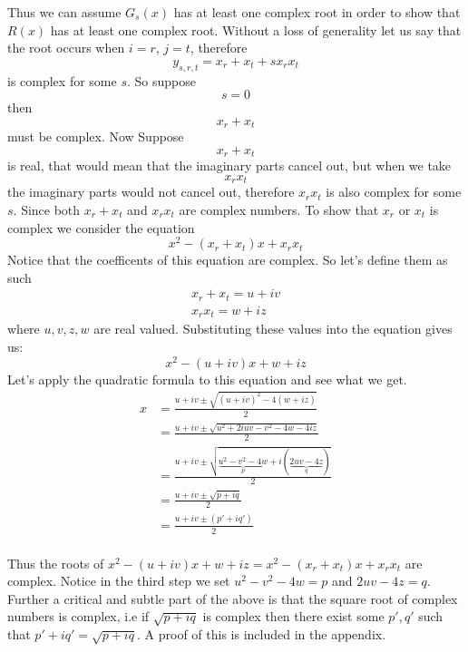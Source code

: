 \documentclass[12pt]{article}
\begin{document}
\begin{center}
\end{center}

  Thus we can assume $G_s(x)$ has at least one complex root in order to show that $R(x)$ has at least one complex root.  Without a loss of generality let us say that the root occurs when $i=r$, $j=t$, therefore 
$$y_{s,r,t} = x_r + x_t +s x_r x_t$$ 
is complex for some $s$.  So suppose 
$$s=0$$ 
then 
$$x_r + x_t$$ 
must be complex.  Now Suppose 
$$x_r + x_t$$ 
is real, that would mean that the imaginary parts cancel out, but when we take 
$$x_r x_t$$ 
the imaginary parts would not cancel out, therefore $x_r x_t$ is also complex for some $s$.  Since both $x_r+x_t$ and $x_r x_t$ are complex numbers.  To show that $x_r$ or $x_t$ is complex we consider the equation 
$$x^2 - (x_r +x_t)x + x_r x_t$$  Notice that the coefficents of this equation are complex.  So let's define them as such 
\begin{align*}
x_r + x_t = u + iv \\
x_r x_t = w +iz
\end{align*}
where $u,v,z,w$ are real valued.  Substituting these values into the equation gives us:
$$ x^2 -(u+iv)x + w +iz$$
Let's apply the quadratic formula to this equation and see what we get.
\begin{align*}
x &= \frac{u+iv \pm \sqrt{(u+iv)^2-4(w+iz)}}{2} \\
&= \frac{u+iv \pm \sqrt{u^2 +2iuv - v^2 - 4w - 4iz}}{2} \\
&= \frac{u+iv \pm \sqrt{\underbrace{u^2 - v^2 -4w}_p + i (\underbrace{2uv-4z}_q)}}{2}  \\
&= \frac{u+iv \pm \sqrt{p+iq}}{2} \\
&= \frac{u+ iv \pm (p' +iq')}{2} \\
\end{align*}

Thus the roots of $ x^2 -(u+iv)x + w +iz = x^2 - (x_r +x_t)x + x_r x_t$ are complex.  Notice in the third step we set $u^2 - v^2 -4w=p$ and $2uv-4z=q$.  Further a critical and subtle part of the above is that the square root of complex numbers is complex, i.e if $\sqrt{p+iq}$ is complex then there exist some $p', q'$ such that $p' +iq' = \sqrt{p+iq}$.  A proof of this is included in the appendix.\\
\end{document}
